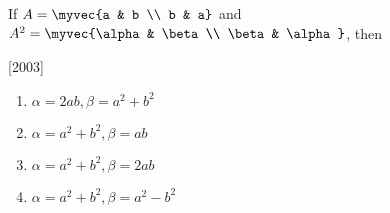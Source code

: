 \item
        If $A=\myvec{a & b \\ b & a}$ and $A^{2}=\myvec{\alpha & \beta \\ \beta & \alpha}$, then 
        
        \hfill[2003]
                                             
        \begin{enumerate}
		\item $\alpha=2ab, \beta=a^{2}+b^{2}$
                \item $\alpha=a^{2}+b^{2}, \beta=ab$
                \item $\alpha=a^{2}+b^{2}, \beta=2ab$
                \item $\alpha=a^{2}+b^{2}, \beta=a^{2}-b^{2}$
        \end{enumerate}

		
